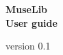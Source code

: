 \pagecolor{purple}
\begin{titlepage}
    \begin{center}
        \vspace*{1cm}
        \Huge
        \textbf{MuseLib\\\Large User guide}
        
        \vspace{0.5cm}
        
        \normalsize
        version 0.1
        \vfill
        
    \end{center}
\end{titlepage}
